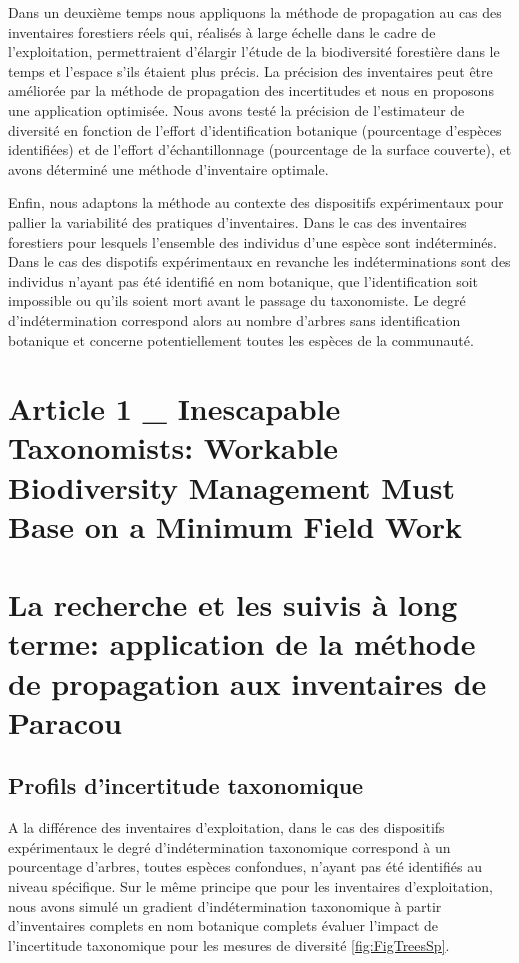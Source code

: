 \documentclass[
  11pt,
  french,
  A4paper,
  extrafontsizes,onecolumn,openright
  ]{memoir}
\begin{document}
Dans un deuxième temps nous appliquons la méthode de propagation au cas
des inventaires forestiers réels qui, réalisés à large échelle dans le
cadre de l'exploitation, permettraient d'élargir l'étude de la
biodiversité forestière dans le temps et l'espace s'ils étaient plus
précis. La précision des inventaires peut être améliorée par la méthode
de propagation des incertitudes et nous en proposons une application
optimisée. Nous avons testé la précision de l'estimateur de diversité en
fonction de l'effort d'identification botanique (pourcentage d'espèces
identifiées) et de l'effort d'échantillonnage (pourcentage de la surface
couverte), et avons déterminé une méthode d'inventaire optimale.

Enfin, nous adaptons la méthode au contexte des dispositifs
expérimentaux pour pallier la variabilité des pratiques d'inventaires.
Dans le cas des inventaires forestiers pour lesquels l'ensemble des
individus d'une espèce sont indéterminés. Dans le cas des dispotifs
expérimentaux en revanche les indéterminations sont des individus
n'ayant pas été identifié en nom botanique, que l'identification soit
impossible ou qu'ils soient mort avant le passage du taxonomiste. Le
degré d'indétermination correspond alors au nombre d'arbres sans
identification botanique et concerne potentiellement toutes les espèces
de la communauté.

\section{Article 1 \_ Inescapable Taxonomists: Workable Biodiversity
Management Must Base on a Minimum Field
Work}\label{article-1-_-inescapable-taxonomists-workable-biodiversity-management-must-base-on-a-minimum-field-work}

\section{La recherche et les suivis à long terme: application de la
méthode de propagation aux inventaires de
Paracou}\label{la-recherche-et-les-suivis-a-long-terme-application-de-la-methode-de-propagation-aux-inventaires-de-paracou}

\subsection{Profils d'incertitude
taxonomique}\label{profils-dincertitude-taxonomique}

A la différence des inventaires d'exploitation, dans le cas des
dispositifs expérimentaux le degré d'indétermination taxonomique
correspond à un pourcentage d'arbres, toutes espèces confondues, n'ayant
pas été identifiés au niveau spécifique. Sur le même principe que pour
les inventaires d'exploitation, nous avons simulé un gradient
d'indétermination taxonomique à partir d'inventaires complets en nom
botanique complets évaluer l'impact de l'incertitude taxonomique pour
les mesures de diversité \ref{fig:FigTreesSp}.
\end{document}
